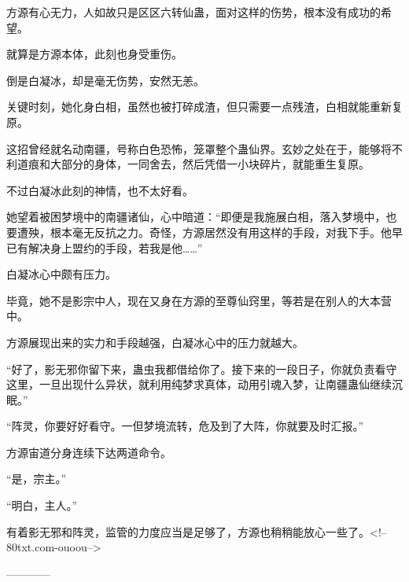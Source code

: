 \begin{this_body}
方源有心无力，人如故只是区区六转仙蛊，面对这样的伤势，根本没有成功的希望。

就算是方源本体，此刻也身受重伤。

倒是白凝冰，却是毫无伤势，安然无恙。

关键时刻，她化身白相，虽然也被打碎成渣，但只需要一点残渣，白相就能重新复原。

这招曾经就名动南疆，号称白色恐怖，笼罩整个蛊仙界。玄妙之处在于，能够将不利道痕和大部分的身体，一同舍去，然后凭借一小块碎片，就能重生复原。

不过白凝冰此刻的神情，也不太好看。

她望着被困梦境中的南疆诸仙，心中暗道：“即便是我施展白相，落入梦境中，也要遭殃，根本毫无反抗之力。奇怪，方源居然没有用这样的手段，对我下手。他早已有解决身上盟约的手段，若我是他……”

白凝冰心中颇有压力。

毕竟，她不是影宗中人，现在又身在方源的至尊仙窍里，等若是在别人的大本营中。

方源展现出来的实力和手段越强，白凝冰心中的压力就越大。

“好了，影无邪你留下来，蛊虫我都借给你了。接下来的一段日子，你就负责看守这里，一旦出现什么异状，就利用纯梦求真体，动用引魂入梦，让南疆蛊仙继续沉眠。”

“阵灵，你要好好看守。一但梦境流转，危及到了大阵，你就要及时汇报。”

方源宙道分身连续下达两道命令。

“是，宗主。”

“明白，主人。”

有着影无邪和阵灵，监管的力度应当是足够了，方源也稍稍能放心一些了。<!--80txt.com-ouoou-->

------------

\end{this_body}

